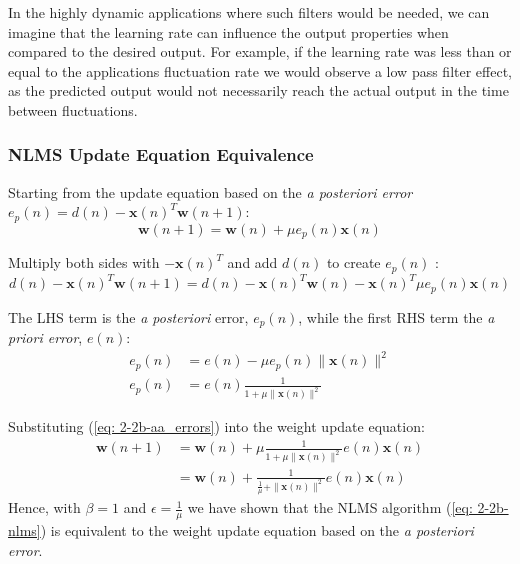 \documentclass[12pt]{article}
\numberwithin{equation}{section}
\def\vw{{\bm{w}}}
\begin{document}
			In the highly dynamic applications where such filters would be needed, we can imagine that the learning rate can influence the output properties when compared to the desired output. For example, if the learning rate was less than or equal to the applications fluctuation rate we would observe a low pass filter effect, as the predicted output would not necessarily reach the actual output in the time between fluctuations.
		
		\subsubsection{NLMS Update Equation Equivalence}
			Starting from the update equation based on the \textit{a posteriori error} $e_{p}(n) = d(n) - \mathbf{x}(n)^{T} \vw(n + 1)$:
			\begin{equation}
			\vw(n + 1) = \vw(n) + \mu e_{p}(n) \mathbf{x}(n)
			\end{equation}
			
			Multiply both sides with $-\mathbf{x}(n)^{T}$ and add $d(n)$ to create $e_{p}(n)$ :
			\begin{equation}
			d(n) - \mathbf{x}(n)^{T} \vw(n + 1) = d(n) - \mathbf{x}(n)^{T} \vw(n) - \mathbf{x}(n)^{T} \mu e_{p}(n) \mathbf{x}(n)
			\end{equation}
			
			The LHS term is the \textit{a posteriori} error, $e_{p}(n)$, while the first RHS term the \textit{a priori error}, $e(n)$:
			\begin{align}
			e_{p}(n)    &= e(n) - \mu e_{p}(n) \| \mathbf{x}(n) \|^{2} \\
			e_{p}(n)    &= e(n) \frac{1}{1 + \mu \| \mathbf{x}(n) \|^{2}}
			\label{eq: 2-2b-aa_errors}
			\end{align}
			
			Substituting (\ref{eq: 2-2b-aa_errors}) into the weight update equation:
			\begin{align}
			\vw(n + 1)  &= \vw(n) + \mu \frac{1}{1 + \mu \| \mathbf{x}(n) \|^{2}} e(n) \mathbf{x}(n) \\
			  &= \vw(n) + \frac{1}{\frac{1}{\mu} + \| \mathbf{x}(n) \|^{2}} e(n) \mathbf{x}(n) \label{eq: 2-2b-nlms}
			\end{align}
			\noindent
			Hence, with $\beta = 1$ and $\epsilon = \frac{1}{\mu}$ we have shown that the NLMS algorithm (\ref{eq: 2-2b-nlms}) is equivalent to the weight update equation based on the \textit{a posteriori error}.
		
\end{document}

